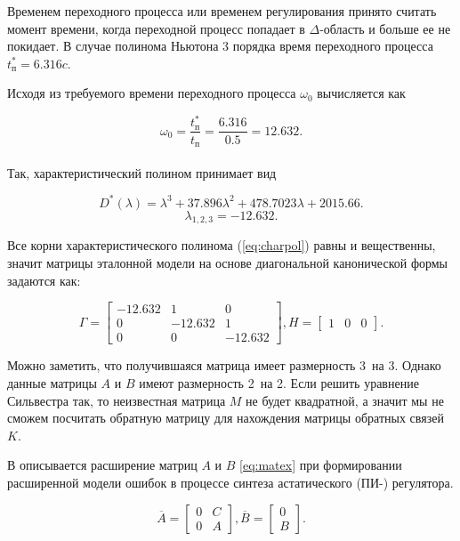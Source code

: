 Временем переходного процесса или временем регулирования принято считать момент времени, когда
переходной процесс попадает в $\Delta$-область и больше ее не покидает. В случае полинома Ньютона
3 порядка время переходного процесса $t_{\text{п}}^{\text{*}}=6.316 c$.


Исходя из требуемого времени переходного процесса $\omega_0$ вычисляется как

$$
  \omega_0=\frac{t_{\text{п}}^{\text{*}}}{t_{\text{п}}}=\frac{6.316}{0.5}=12.632.
$$\\
Так, характеристический полином принимает вид

\begin{equation}
  D^{\text{*}}(\lambda)=\lambda^3+37.896\lambda^2+478.7023\lambda+2015.66.
  \label{eq:charpol}
\end{equation}
$$
  \lambda_{1,2,3}=-12.632.
$$

Все корни характеристического полинома (\ref{eq:charpol}) равны и вещественны, значит
матрицы эталонной модели на основе диагональной канонической формы 
задаются как:

$$
  \Gamma=\begin{bmatrix}-12.632&1&0\\0&-12.632&1\\0&0&-12.632\end{bmatrix}, H=\begin{bmatrix}1&0&0\end{bmatrix}.
$$

Можно заметить, что получившаяся матрица имеет размерность 3~на 3. Однако данные матрицы 
$A$ и $B$ имеют размерность 2~на 2. Если решить уравнение Сильвестра так, то неизвестная
матрица $M$ не будет квадратной, а значит мы не сможем посчитать обратную матрицу
для нахождения матрицы обратных связей $K$.

В \cite{МодальноеУправление} описывается расширение матриц $A$ и $B$ \ref{eq:matex} при
формировании расширенной модели ошибок в процессе
синтеза астатического (ПИ-) регулятора.

\begin{equation}
  \overline{A}=\begin{bmatrix}0&C\\0&A\end{bmatrix}, \overline{B}=\begin{bmatrix}0\\B\end{bmatrix}.
  \label{eq:matex}
\end{equation}


